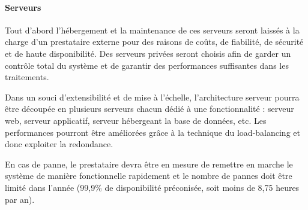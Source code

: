 \documentclass[a4paper]{article}
\begin{document}
\paragraph{Serveurs}

Tout d'abord l'hébergement et la maintenance de ces serveurs seront laissés à la charge d'un prestataire externe pour des raisons de coûts, de fiabilité, de sécurité et de haute disponibilité. Des serveurs privées seront choisis afin de garder un contrôle total du système et de garantir des performances suffisantes dans les traitements.

Dans un souci d'extensibilité et de mise à l'échelle, l'architecture serveur pourra être découpée en plusieurs serveurs chacun dédié à une fonctionnalité : serveur web, serveur applicatif, serveur hébergeant la base de données, etc. Les performances pourront être améliorées grâce à la technique du load-balancing et donc exploiter la redondance.

En cas de panne, le prestataire devra être en mesure de remettre en marche le système de manière fonctionnelle rapidement et le nombre de pannes doit être limité dans l'année (99,9\% de disponibilité préconisée, soit moins de 8,75 heures par an).
\end{document}
